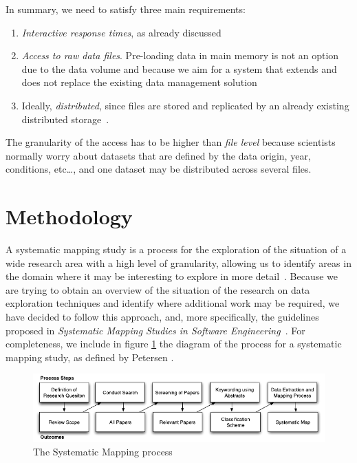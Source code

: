 
In summary, we need to satisfy three main requirements:

\begin{enumerate}
  \item \emph{Interactive response times}, as already discussed
  \item \emph{Access to raw data files}. Pre-loading data in main memory is not an
    option due to the data volume and because we aim for a system that extends and does
    not replace the existing data management solution
  \item Ideally, \emph{distributed}, since files are stored and replicated by an already existing
    distributed storage~\cite{Baud2012}.
\end{enumerate}

The granularity of the access has to be higher than \emph{file level} because
scientists normally worry about datasets that are defined by the data origin,
year, conditions, etc\ldots, and one dataset may be distributed across
several files.

\vfill

\section{Methodology}
\label{sec:mapping/methodology}

A systematic mapping study is a process for the exploration of the
situation of a wide research area with a high level of granularity,
allowing us to identify areas in the domain where it may be interesting to
explore in more detail~\cite{Kitchenham2007}. Because we are trying to obtain
an overview of the situation of the research on data exploration techniques
and identify where additional work may be required, we have decided to follow this
approach, and, more specifically, the guidelines proposed in
\emph{Systematic Mapping Studies in Software Engineering}~\cite{Petersen2007}.
For completeness, we include in figure \ref{fig:systematicmapping_diagram} the
diagram of the process for a systematic mapping study, as defined by
Petersen \etal.

\begin{figure}[ht]
    \centering
    \includegraphics{images/3_mapping/systematicmapping_diagram}
    \caption{The Systematic Mapping process}
    \label{fig:systematicmapping_diagram}
\end{figure}

